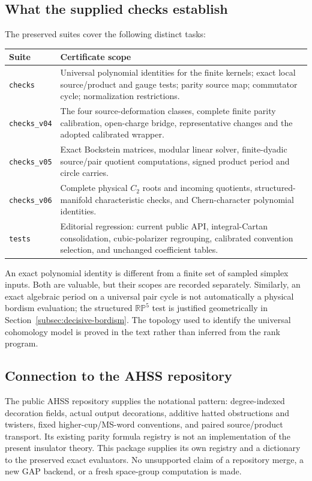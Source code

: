 \subsection{What the supplied checks establish}
The preserved suites cover the following distinct tasks:
\begin{center}
\begin{tabularx}{\textwidth}{@{}lX@{}}\toprule
Suite & Certificate scope\\\midrule
\texttt{checks} & Universal polynomial identities for the finite kernels; exact local source/product and gauge tests; parity source map; commutator cycle; normalization restrictions.\\[2pt]
\texttt{checks\_v04} & The four source-deformation classes, complete finite parity calibration, open-charge bridge, representative changes and the adopted calibrated wrapper.\\[2pt]
\texttt{checks\_v05} & Exact Bockstein matrices, modular linear solver, finite-dyadic source/pair quotient computations, signed product period and circle carries.\\[2pt]
\texttt{checks\_v06} & Complete physical $C_2$ roots and incoming quotients, structured-manifold characteristic checks, and Chern-character polynomial identities.\\[2pt]
\texttt{tests} & Editorial regression: current public API, integral-Cartan consolidation, cubic-polarizer regrouping, calibrated convention selection, and unchanged coefficient tables.\\\bottomrule
\end{tabularx}
\end{center}
An exact polynomial identity is different from a finite set of sampled simplex inputs. Both are valuable, but their scopes are recorded separately. Similarly, an exact algebraic period on a universal pair cycle is not automatically a physical bordism evaluation; the structured $\mathbb{RP}^5$ test is justified geometrically in Section~\ref{subsec:decisive-bordism}. The topology used to identify the universal cohomology model is proved in the text rather than inferred from the rank program.

\subsection{Connection to the AHSS repository}
The public AHSS repository supplies the notational pattern: degree-indexed decoration fields, actual output decorations, additive hatted obstructions and twisters, fixed higher-cup/MS-word conventions, and paired source/product transport. Its existing parity formula registry is not an implementation of the present insulator theory. This package supplies its own registry and a dictionary to the preserved exact evaluators. No unsupported claim of a repository merge, a new GAP backend, or a fresh space-group computation is made.
